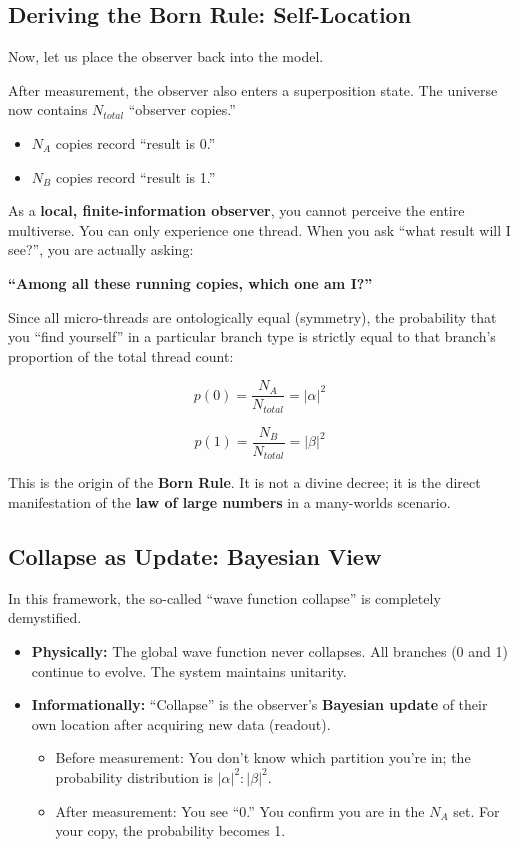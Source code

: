 \subsection{Deriving the Born Rule: Self-Location}

Now, let us place the observer back into the model.

After measurement, the observer also enters a superposition state. The universe now contains \textbf{$N_{total}$} ``observer copies.''

\begin{itemize}
\item \textbf{$N_A$} copies record ``result is 0.''

\item \textbf{$N_B$} copies record ``result is 1.''
\end{itemize}

As a \textbf{local, finite-information observer}, you cannot perceive the entire multiverse. You can only experience one thread. When you ask ``what result will I see?'', you are actually asking:

\textbf{``Among all these running copies, which one am I?''}

Since all micro-threads are ontologically equal (symmetry), the probability that you ``find yourself'' in a particular branch type is strictly equal to that branch's proportion of the total thread count:

$$p(0) = \frac{N_A}{N_{total}} = |\alpha|^2$$

$$p(1) = \frac{N_B}{N_{total}} = |\beta|^2$$

This is the origin of the \textbf{Born Rule}. It is not a divine decree; it is the direct manifestation of the \textbf{law of large numbers} in a many-worlds scenario.

\subsection{Collapse as Update: Bayesian View}

In this framework, the so-called ``wave function collapse'' is completely demystified.

\begin{itemize}
\item \textbf{Physically:} The global wave function never collapses. All branches (0 and 1) continue to evolve. The system maintains unitarity.

\item \textbf{Informationally:} ``Collapse'' is the observer's \textbf{Bayesian update} of their own location after acquiring new data (readout).

    \begin{itemize}
    \item Before measurement: You don't know which partition you're in; the probability distribution is \textbf{$|\alpha|^2 : |\beta|^2$}.

    \item After measurement: You see ``0.'' You confirm you are in the \textbf{$N_A$} set. For your copy, the probability becomes 1.
    \end{itemize}
\end{itemize}

